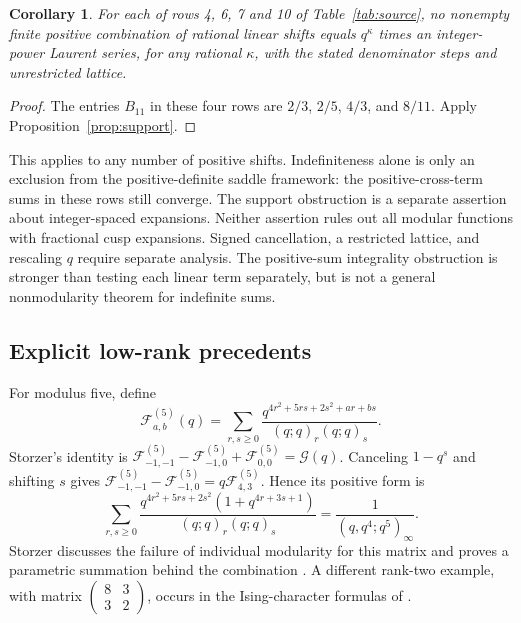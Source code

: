 \documentclass[11pt,reqno]{amsart}
\newcommand{\RG}{\mathcal G}
\newtheorem{corollary}[theorem]{Corollary}
\theoremstyle{remark}
\numberwithin{equation}{section}
\begin{document}
\begin{corollary}\label{cor:source-support}
For each of rows 4, 6, 7 and 10 of Table~\ref{tab:source}, no nonempty
finite positive combination of rational linear shifts equals
$q^\kappa$ times an integer-power Laurent series, for any rational
$\kappa$, with the stated denominator steps and unrestricted lattice.
\end{corollary}
\begin{proof}
The entries $B_{11}$ in these four rows are $2/3$, $2/5$, $4/3$, and
$8/11$. Apply Proposition~\ref{prop:support}.
\end{proof}
This applies to any number of positive shifts. Indefiniteness alone is
only an exclusion from the positive-definite saddle framework: the
positive-cross-term sums in these rows still converge. The support
obstruction is a separate assertion about integer-spaced expansions.
Neither assertion rules out all modular functions with fractional cusp
expansions. Signed cancellation, a restricted lattice, and rescaling
$q$ require separate analysis. The positive-sum integrality obstruction
is stronger than testing each linear term separately, but is not a
general nonmodularity theorem for indefinite sums.

\subsection{Explicit low-rank precedents}
For modulus five, define
\[
 \mathcal F^{(5)}_{a,b}(q)=\sum_{r,s\geq0}
 \frac{q^{4r^2+5rs+2s^2+ar+bs}}{(q;q)_r(q;q)_s}.
\]
Storzer's identity \cite[(6.23)]{Storzer} is
$\mathcal F^{(5)}_{-1,-1}-\mathcal F^{(5)}_{-1,0}+\mathcal F^{(5)}_{0,0}=\RG(q)$.
Canceling $1-q^s$ and shifting $s$ gives
$\mathcal F^{(5)}_{-1,-1}-\mathcal F^{(5)}_{-1,0}=q\mathcal F^{(5)}_{4,3}$. Hence its positive form is
\begin{equation}\label{eq:mod5positive}
 \sum_{r,s\geq0}\frac{q^{4r^2+5rs+2s^2}(1+q^{4r+3s+1})}
 {(q;q)_r(q;q)_s}=\frac1{(q,q^4;q^5)_\infty}.
\end{equation}
Storzer discusses the failure of individual modularity for this matrix
and proves a parametric summation behind the combination
\cite[Theorem~6.3.1]{Storzer}. A different rank-two example, with
matrix $\left(\begin{smallmatrix}8&3\\3&2\end{smallmatrix}\right)$,
occurs in the Ising-character formulas of \cite{AVH}.
\end{document}

